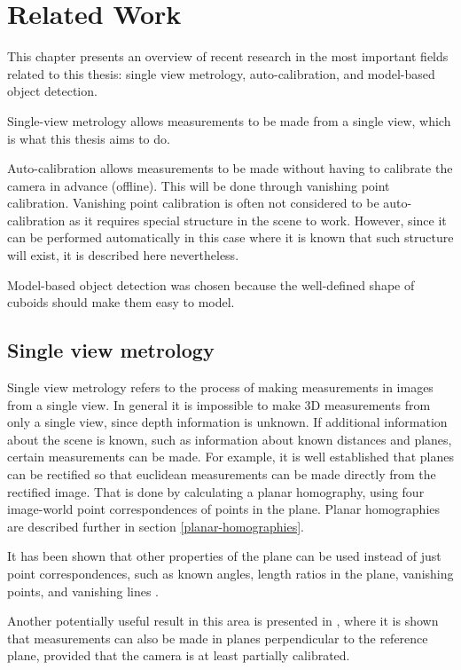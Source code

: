 \chapter{Related Work}
This chapter presents an overview of recent research in the most important fields related to this thesis: single view metrology, auto-calibration, and model-based object detection.

Single-view metrology allows measurements to be made from a single view, which is what this thesis aims to do.

Auto-calibration allows measurements to be made without having to calibrate the camera in advance (offline).
This will be done through vanishing point calibration.
Vanishing point calibration is often not considered to be auto-calibration as it requires special structure in the scene to work. 
However, since it can be performed automatically in this case where it is known that such structure will exist, it is described here nevertheless.

Model-based object detection was chosen because the well-defined shape of cuboids should make them easy to model.

\section{Single view metrology}
Single view metrology refers to the process of making measurements in images from a single view.
In general it is impossible to make 3D measurements from only a single view, since depth information is unknown.
If additional information about the scene is known, such as information about known distances and planes, certain measurements can be made.
For example, it is well established that planes can be rectified so that euclidean measurements can be made directly from the rectified image.
That is done by calculating a planar homography, using four image-world point correspondences of points in the plane.
Planar homographies are described further in section \ref{planar-homographies}.

It has been shown that other properties of the plane can be used instead of just point correspondences, such as known angles, length ratios in the plane, vanishing points, and vanishing lines \cite{liebowitz1998metric} \cite{criminisi2000single}.

Another potentially useful result in this area is presented in \cite{huang2004new}, where it is shown that measurements can also be made in planes perpendicular to the reference plane, provided that the camera is at least partially calibrated.

